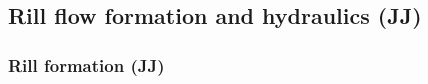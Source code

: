  

        \subsection{Rill flow formation and hydraulics (JJ)}


        \subsubsection{Rill formation (JJ)}

